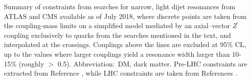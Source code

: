 
Summary of constraints from searches for narrow, light dijet
resonances from ATLAS and CMS available as of
July 2018, where discrete points are taken
from the coupling-mass limits on a simplified model mediated by an
axial--vector $Z^\prime$ coupling exclusively to quarks from the
searches mentioned in the text, and interpolated at the crossings.
Couplings above the lines are excluded at 95\% CL, up to the
values where larger couplings yield a resonance width larger than
10-15\% (roughly \gq $>$ 0.5). Abbreviation:\ DM, dark matter.
Pre-LHC constraints are extracted from Reference ,
while LHC constraints are taken from References \cite{Khachatryan:2016ecr,Aaboud:2018zba,
ATLAS:2016bvn,Sirunyan:2017nvi,Sirunyan:2018xlo,Aaboud:2018fzt,Aaboud:2017yvp}.


